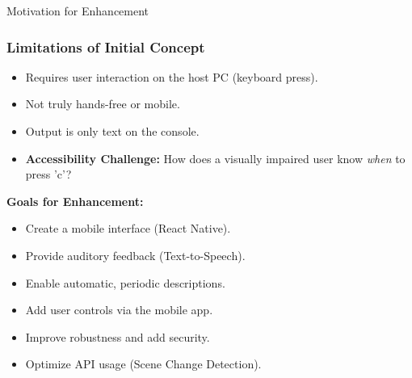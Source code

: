 \documentclass{beamer}
\begin{document}
\begin{frame}{Motivation for Enhancement}
    \frametitle{Limitations of Initial Concept}
    \begin{itemize}
        \item Requires user interaction on the host PC (keyboard press).
        \item Not truly hands-free or mobile.
        \item Output is only text on the console.
        \item \textbf{Accessibility Challenge:} How does a visually impaired user know \textit{when} to press 'c'?
    \end{itemize}
    \vspace{1em}
    \textbf{Goals for Enhancement:}
    \begin{itemize}
        \item Create a mobile interface (React Native).
        \item Provide auditory feedback (Text-to-Speech).
        \item Enable automatic, periodic descriptions.
        \item Add user controls via the mobile app.
        \item Improve robustness and add security.
        \item Optimize API usage (Scene Change Detection).
    \end{itemize}
\end{frame}
\end{document}
